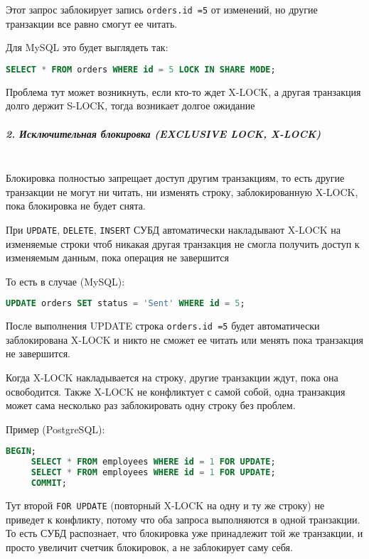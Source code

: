  Этот запрос заблокирует запись \texttt{orders.id =5} от изменений, но другие транзакции все равно смогут ее читать.
 
 Для MySQL это будет выглядеть так:
 \begin{lstlisting}[language=SQL]
     SELECT * FROM orders WHERE id = 5 LOCK IN SHARE MODE;  
 \end{lstlisting}
 
 Проблема тут может возникнуть, если кто-то ждет X-LOCK, а другая транзакция долго держит S-LOCK, тогда возникает долгое ожидание
 
 \subparagraph{2. Исключительная блокировка (EXCLUSIVE LOCK, X-LOCK)} ~\\

 Блокировка полностью запрещает доступ другим транзакциям, то есть другие транзакции не могут ни читать, ни изменять строку, заблокированную X-LOCK, пока блокировка не будет снята.
 
 При \texttt{UPDATE}, \texttt{DELETE}, \texttt{INSERT} СУБД автоматически накладывают X-LOCK на изменяемые строки чтоб никакая другая транзакция не смогла получить доступ к изменяемым данным, пока операция не завершится
 
 То есть в случае (MySQL):
 \begin{lstlisting}[language=SQL]
     UPDATE orders SET status = 'Sent' WHERE id = 5; 
 \end{lstlisting}

 После выполнения UPDATE строка \texttt{orders.id =5} будет автоматически заблокирована X-LOCK и никто не сможет ее читать или менять пока транзакция не завершится.
 
 Когда X-LOCK накладывается на строку, другие транзакции ждут, пока она освободится. Также X-LOCK не конфликтует с самой собой, одна транзакция может сама несколько раз заблокировать одну строку без проблем.
 
 Пример (PostgreSQL):
 \begin{lstlisting}[language=SQL]
     BEGIN;
     SELECT * FROM employees WHERE id = 1 FOR UPDATE;
     SELECT * FROM employees WHERE id = 1 FOR UPDATE;
     COMMIT;    
 \end{lstlisting}

 Тут второй \texttt{FOR UPDATE} (повторный X-LOCK на одну и ту же строку) не приведет к конфликту, потому что оба запроса выполняются в одной транзакции. То есть СУБД распознает, что блокировка уже принадлежит той же транзакции, и просто увеличит счетчик блокировок, а не заблокирует саму себя.
 
